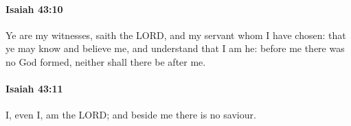 		\paragraph{Isaiah 43:10} %
			\label{ISAIAH-43-10}

			Ye are my witnesses, saith the LORD, and my servant whom I have chosen: that ye may know and believe me, and understand that I am he: before me there was no God formed, neither shall there be after me.


		\paragraph{Isaiah 43:11} %
			\label{ISAIAH-43-11}

			I, even I, am the LORD; and beside me there is no saviour.


